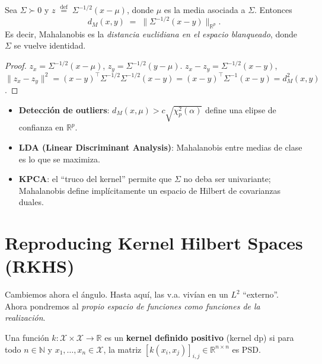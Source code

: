 \begin{proposition}
	\label{prop:mahalanobis-whitening}
	Sea $\Sigma \succ 0$ y $z \;\stackrel{\text{def}}{=}\; \Sigma^{-1/2}(x - \mu)$,
	donde $\mu$ es la media asociada a $\Sigma$.  Entonces
	\[
	d_M(x, y) \;=\; \| \Sigma^{-1/2}(x - y) \|_{\mathbb{R}^p}.
	\]
	Es decir, Mahalanobis es la \emph{distancia euclidiana en el espacio
	blanqueado}, donde $\Sigma$ se vuelve identidad.
\end{proposition}

\begin{proof}
	$z_x = \Sigma^{-1/2}(x - \mu)$, $z_y = \Sigma^{-1/2}(y - \mu)$.
	$z_x - z_y = \Sigma^{-1/2}(x - y)$, $\|z_x - z_y\|^2 = (x-y)^\top
	\Sigma^{-1/2}\Sigma^{-1/2}(x-y) = (x-y)^\top \Sigma^{-1}(x-y) = d_M^2(x,y)$.
\end{proof}

\begin{remark}[Aplicaciones]
	\begin{itemize}
		\item \textbf{Detección de outliers}: $d_M(x,\mu) > c\sqrt{\chi^2_p(\alpha)}$
		define una elipse de confianza en $\mathbb{R}^p$.
		\item \textbf{LDA (Linear Discriminant Analysis)}: Mahalanobis entre medias
		de clase es lo que se maximiza.
		\item \textbf{KPCA}: el ``truco del kernel'' permite que $\Sigma$ no deba
		ser univariante; Mahalanobis define implícitamente un espacio de Hilbert
		de covarianzas duales.
	\end{itemize}
\end{remark}

\section{Reproducing Kernel Hilbert Spaces (RKHS)}

Cambiemos ahora el ángulo.  Hasta aquí, las v.a. vivían en un $L^2$ ``externo''.
Ahora pondremos al \emph{propio espacio de funciones como funciones de la
realización}.

\begin{definition}
	\label{def:kernel}
	Una función $k : \mathcal{X} \times \mathcal{X} \to \mathbb{R}$ es un
	\textbf{kernel definido positivo} (kernel dp) si para todo
	$n \in \mathbb{N}$ y $x_1, \dots, x_n \in \mathcal{X}$, la matriz
	$[k(x_i, x_j)]_{i,j} \in \mathbb{R}^{n \times n}$ es PSD.
\end{definition}

